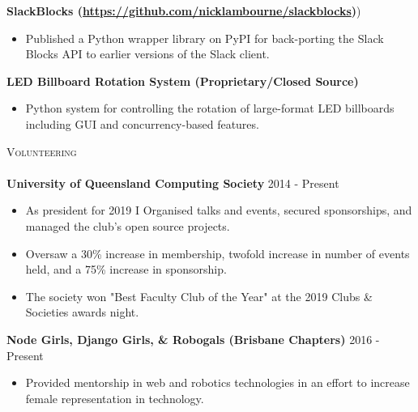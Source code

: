 \documentclass[a4paper]{article}
\newcommand{\lineunder} {
    \vspace*{-8pt} \\
    \hspace*{-10pt} \hrulefill \\
}
\newcommand{\header} [1] {
    {\hspace*{-10pt}\vspace*{6pt} \textsc{#1}}
    \vspace*{-6pt} \lineunder
}
\newenvironment{singleitem}
{   \small
    \vspace{0pt}
    \begin{itemize}
    \setlength{\itemsep}{0pt}
    \setlength{\parskip}{0pt}
    \setlength{\parsep}{0pt}   }
{\end{itemize} \vspace{1pt}	}
\begin{document}
\textbf{SlackBlocks (\href{https://github.com/nicklambourne/slackblocks}{https://github.com/nicklambourne/slackblocks})})
\begin{singleitem}
	\item Published a Python wrapper library on PyPI for back-porting the Slack Blocks API to earlier versions of the Slack client.
\end{singleitem}

\textbf{LED Billboard Rotation System (Proprietary/Closed Source)}
\begin{singleitem}
	\item Python system for controlling the rotation of large-format LED billboards including GUI and concurrency-based features.
\end{singleitem}

\vspace{1mm}

\header{Volunteering}
\textbf{University of Queensland Computing Society} \hfill 2014 - Present\\
\begin{singleitem}
	\item As president for 2019 I Organised talks and events, secured sponsorships, and managed the club's open source projects.
	\item Oversaw a 30\% increase in membership, twofold increase in number of events held, and a 75\% increase in sponsorship.
	\item The society won "Best Faculty Club of the Year" at the 2019 Clubs \& Societies awards night.
\end{singleitem}
\textbf{Node Girls, Django Girls, \& Robogals (Brisbane Chapters)} \hfill 2016 - Present\\
\begin{singleitem}
	\item Provided mentorship in web and robotics technologies in an effort to increase female representation in technology.
\end{singleitem}
\end{document}
